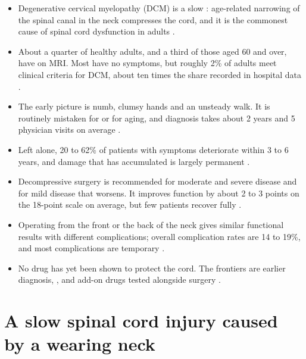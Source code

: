 \documentclass[11pt, letterpaper]{article}
\begin{document}
\begin{note}[In brief]
\begin{itemize}
  \item Degenerative cervical myelopathy (DCM) is a slow : age-related narrowing of the spinal canal in the neck compresses the cord, and it is the commonest cause of spinal cord dysfunction in adults \citep{badhiwala2020,nouri2015}.
  \item About a quarter of healthy adults, and a third of those aged 60 and over, have  on MRI. Most have no symptoms, but roughly 2\% of adults meet clinical criteria for DCM, about ten times the share recorded in hospital data \citep{smith2021,grodzinski2023}.
  \item The early picture is numb, clumsy hands and an unsteady walk. It is routinely mistaken for  or for aging, and diagnosis takes about 2 years and 5 physician visits on average \citep{behrbalk2013}.
  \item Left alone, 20 to 62\% of patients with symptoms deteriorate within 3 to 6 years, and damage that has accumulated is largely permanent \citep{fehlings2017cpg}.
  \item Decompressive surgery is recommended for moderate and severe disease and for mild disease that worsens. It improves function by about 2 to 3 points on the 18-point  scale on average, but few patients recover fully \citep{fehlings2017cpg,fehlings2015}.
  \item Operating from the front or the back of the neck gives similar functional results with different complications; overall complication rates are 14 to 19\%, and most complications are temporary \citep{ghogawala2021,fehlings2012}.
  \item No drug has yet been shown to protect the cord. The frontiers are earlier diagnosis, , and add-on  drugs tested alongside surgery \citep{fehlings2021,badhiwala2020}.
\end{itemize}
\end{note}

\tableofcontents

\section{A slow spinal cord injury caused by a wearing neck}
\end{document}
